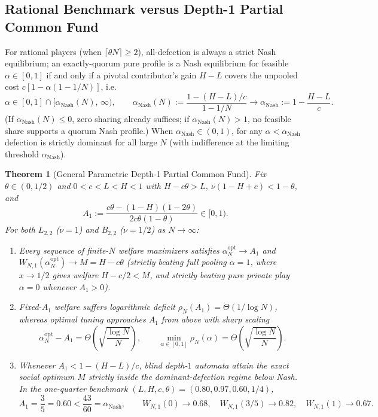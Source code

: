 \documentclass[11pt,reqno]{amsart}
\newtheorem{theorem}{Theorem}[section]
\theoremstyle{definition}
\theoremstyle{remark}
\begin{document}
\subsection{Rational Benchmark versus Depth-1 Partial Common Fund}
For rational players (when $\lceil \theta N \rceil \ge 2$), all-defection is always a strict Nash equilibrium; an exactly-quorum pure profile is a Nash equilibrium for feasible $\alpha \in [0,1]$ if and only if a pivotal contributor's gain $H-L$ covers the unpooled cost $c[1-\alpha(1-1/N)]$, i.e.\
\[
  \alpha \in [0,1] \cap \bigl[\alpha_{\mathrm{Nash}}(N),\, \infty\bigr), \qquad
  \alpha_{\mathrm{Nash}}(N) := \frac{1 - (H-L)/c}{1 - 1/N} \longrightarrow \alpha_{\mathrm{Nash}} := 1 - \frac{H-L}{c}.
\]
(If $\alpha_{\mathrm{Nash}}(N) \le 0$, zero sharing already suffices; if $\alpha_{\mathrm{Nash}}(N) > 1$, no feasible share supports a quorum Nash profile.) When $\alpha_{\mathrm{Nash}} \in (0,1)$, for any $\alpha < \alpha_{\mathrm{Nash}}$ defection is strictly dominant for all large $N$ (with indifference at the limiting threshold $\alpha_{\mathrm{Nash}}$).

\begin{theorem}[General Parametric Depth-1 Partial Common Fund]\label{thm:fund-n1}
Fix $\theta \in (0, 1/2)$ and $0 < c < L < H < 1$ with $H - c\theta > L$, $\nu(1 - H + c) < 1 - \theta$, and
\begin{equation}\label{eq:A1-formula}
  A_1 := \frac{c\theta - (1-H)(1-2\theta)}{2c\theta(1-\theta)} \in [0, 1).
\end{equation}
For both $L_{2,2}$ ($\nu=1$) and $B_{2,2}$ ($\nu=1/2$) as $N \to \infty$:
\begin{enumerate}
  \item Every sequence of finite-$N$ welfare maximizers satisfies $\alpha_N^{\mathrm{opt}} \to A_1$ and $W_{N,1}(\alpha_N^{\mathrm{opt}}) \to M = H - c\theta$ (strictly beating full pooling $\alpha = 1$, where $x \to 1/2$ gives welfare $H - c/2 < M$, and strictly beating pure private play $\alpha = 0$ whenever $A_1 > 0$).
  \item Fixed-$A_1$ welfare suffers logarithmic deficit $\rho_N(A_1) = \Theta(1/\log N)$, whereas optimal tuning approaches $A_1$ from above with sharp scaling
  \begin{equation}\label{eq:finite-N-rate}
    \alpha_N^{\mathrm{opt}} - A_1 = \Theta\!\left(\sqrt{\frac{\log N}{N}}\right), \qquad
    \min_{\alpha \in [0,1]} \rho_N(\alpha) = \Theta\!\left(\sqrt{\frac{\log N}{N}}\right).
  \end{equation}
  \item Whenever $A_1 < 1 - (H-L)/c$, blind depth-$1$ automata attain the exact social optimum $M$ strictly inside the dominant-defection regime below Nash. In the one-quarter benchmark $(L,H,c,\theta) = (0.80, 0.97, 0.60, 1/4)$,
  \[
    A_1 = \frac{3}{5} = 0.60 < \frac{43}{60} = \alpha_{\mathrm{Nash}}, \qquad
    W_{N,1}(0) \to 0.68, \quad W_{N,1}(3/5) \to 0.82, \quad W_{N,1}(1) \to 0.67.
  \]
\end{enumerate}
\end{theorem}
\end{document}
